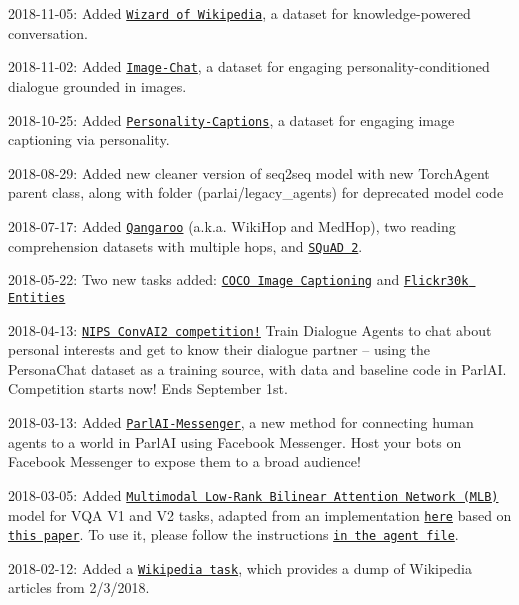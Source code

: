 2018-\/11-\/05\+: Added \href{http://parl.ai/projects/wizard_of_wikipedia/}{\tt Wizard of Wikipedia}, a dataset for knowledge-\/powered conversation.

2018-\/11-\/02\+: Added \href{https://klshuster.github.io/image_chat/}{\tt Image-\/\+Chat}, a dataset for engaging personality-\/conditioned dialogue grounded in images.

2018-\/10-\/25\+: Added \href{https://arxiv.org/abs/1810.10665}{\tt Personality-\/\+Captions}, a dataset for engaging image captioning via personality.

2018-\/08-\/29\+: Added new cleaner version of seq2seq model with new Torch\+Agent parent class, along with folder (parlai/legacy\+\_\+agents) for deprecated model code

2018-\/07-\/17\+: Added \href{http://qangaroo.cs.ucl.ac.uk/}{\tt Qangaroo} (a.\+k.\+a. Wiki\+Hop and Med\+Hop), two reading comprehension datasets with multiple hops, and \href{https://rajpurkar.github.io/SQuAD-explorer/}{\tt S\+Qu\+AD 2}.

2018-\/05-\/22\+: Two new tasks added\+: \href{http://cocodataset.org/#captions-2015}{\tt C\+O\+CO Image Captioning} and \href{http://web.engr.illinois.edu/~bplumme2/Flickr30kEntities/}{\tt Flickr30k Entities}

2018-\/04-\/13\+: \href{http://convai.io/}{\tt N\+I\+PS Conv\+A\+I2 competition!} Train Dialogue Agents to chat about personal interests and get to know their dialogue partner -- using the Persona\+Chat dataset as a training source, with data and baseline code in Parl\+AI. Competition starts now! Ends September 1st.

2018-\/03-\/13\+: Added \href{http://parl.ai/static/docs/messenger.html}{\tt Parl\+A\+I-\/\+Messenger}, a new method for connecting human agents to a world in Parl\+AI using Facebook Messenger. Host your bots on Facebook Messenger to expose them to a broad audience!

2018-\/03-\/05\+: Added \href{https://github.com/facebookresearch/ParlAI/blob/master/parlai/agents/mlb_vqa/mlb_vqa.py}{\tt Multimodal Low-\/\+Rank Bilinear Attention Network (M\+LB)} model for V\+QA V1 and V2 tasks, adapted from an implementation \href{https://github.com/Cadene/vqa.pytorch}{\tt here} based on \href{https://arxiv.org/abs/1610.04325}{\tt this paper}. To use it, please follow the instructions \href{https://github.com/facebookresearch/ParlAI/blob/master/parlai/agents/mlb_vqa/mlb_vqa.py}{\tt in the agent file}.

2018-\/02-\/12\+: Added a \href{https://github.com/facebookresearch/ParlAI/blob/master/parlai/tasks/wikipedia/agents.py}{\tt Wikipedia task}, which provides a dump of Wikipedia articles from 2/3/2018.

